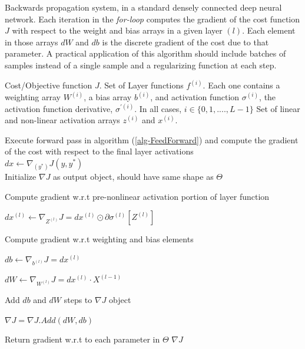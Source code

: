 \documentclass[12pt,letterpaper]{article}
\begin{document}
\begin{algorithm}[H]
\caption{Backwards propagation system, in a standard densely connected deep neural network. Each iteration in the \textit{for-loop} computes the gradient of the cost function $J$ with respect to the weight and bias arrays in a given layer $(l)$. Each element in those arrays $dW$ and $db$ is the discrete gradient of the cost due to that parameter. A practical application of this algorithm should include batches of samples instead of a single sample and a regularizing function at each step.}
\label{alg-BackProp}

\begin{algorithmic}
\REQUIRE Cost/Objective function $J$.
\REQUIRE Set of Layer functions $f^{(i)}$. Each one contains a weighting array $W^{(i)}$, a bias array $b^{(i)}$, and activation function $\sigma^{(i)}$, the activation function derivative, $\sigma^{'(i)}$. In all cases, $i \in \{0,1,....,L-1\}$
\REQUIRE Set of linear and non-linear activation arrays $z^{(i)}$ and $x^{(i)}$.

Execute forward pass in algorithm (\ref{alg-FeedForward}) and compute the gradient of the cost with respect to the final layer activations \\
$dx \leftarrow \nabla_{(y^*)}J(y,y^*)$ \\
Initialize $\nabla J$ as output object, should have same shape as $\Theta$

	\item Compute gradient w.r.t pre-nonlinear activation portion of layer function
	\item $dx^{(l)} \leftarrow \nabla_{Z^{(l)}}J = dx^{(l)} \odot \partial\sigma^{(l)}[ Z^{(l)} ]$
	\item Compute gradient w.r.t weighting and bias elements
	\item $db \leftarrow \nabla_{b^{(l)}}J = dx^{(l)}$
	\item $dW \leftarrow \nabla_{W^{(l)}}J = dx^{(l)} \cdot X^{(l-1)}$

	\item Add $db$ and $dW$ steps to $\nabla J$ object
	\item $\nabla J = \nabla J .Add(dW,db)$
\ENDFOR

\item Return gradient w.r.t to each parameter in $\Theta$
\RETURN $\nabla J$

\end{algorithmic}
\end{algorithm}
\end{document}
